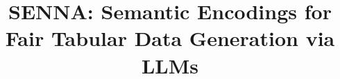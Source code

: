\documentclass[runningheads]{llncs}
\begin{document}
%
\title{SENNA: Semantic Encodings for Fair Tabular Data Generation via LLMs}
%

%




\maketitle  
\begingroup
\renewcommand{\thefootnote}{}%
\endgroup
\setcounter{footnote}{0}
\end{document}
